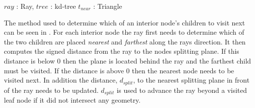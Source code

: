 \begin{algorithm}
  \caption{A general kd-tree traversal algorithm for ray tracing}
  \label{alg:generalTracing}
  \begin{algorithmic}
              {$ray$ : Ray, $tree$ : kd-tree}
              {$t_{near}$ : Triangle}{
                  \ELSE
                  \ENDIF
                \ENDWHILE
              }
  \end{algorithmic}
\end{algorithm}


The method used to determine which of an interior node's children to visit next
can be seen in . For each interior node the ray
first needs to determine which of the two children are placed \textit{nearest}
and \textit{farthest} along the rays direction. It then computes the signed
distance from the ray to the nodes splitting plane. If this distance is below 0
then the plane is located behind the ray and the farthest child must be
visited. If the distance is above 0 then the nearest node needs to be visited
next. In addition the distance, $d_{split}$, to the nearest splitting plane in
front of the ray needs to be updated. $d_{split}$ is used to advance the ray
beyond a visited leaf node if it did not intersect any geometry.

